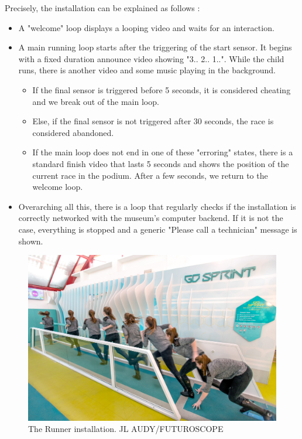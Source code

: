 \documentclass{sigchi}
\begin{document}
Precisely, the installation can be explained as follows : 
\begin{itemize}
    \item A "welcome" loop displays a looping video and waits for an interaction.
    \item A main running loop starts after the triggering of the start sensor. It begins with a fixed duration announce video showing "3.. 2.. 1..". While the child runs, there is another video and some music playing in the background. 
    \begin{itemize}
    	\item If the final sensor is triggered before 5 seconds, it is considered cheating and we break out of the main loop.    	
    	\item Else, if the final sensor is not triggered after 30 seconds, the race is considered abandoned.     	
    	\item If the main loop does not end in one of these "erroring" states, there is a standard finish video that lasts 5 seconds and shows the position of the current race in the podium. After a few seconds, we return to the welcome loop.
    \end{itemize}    
    \item Overarching all this, there is a loop that regularly checks if the installation is correctly networked with the museum's computer backend. If it is not the case, everything is stopped and a generic "Please call a technician" message is shown.
\end{itemize}

\begin{figure}
    \centering
    \includegraphics[scale=0.6]{images/futuroscope.jpg}
    \caption{The Runner installation. \tiny{\textcopyright JL AUDY/FUTUROSCOPE}}
    \label{fig.futuroscope}
\end{figure}
\end{document}
